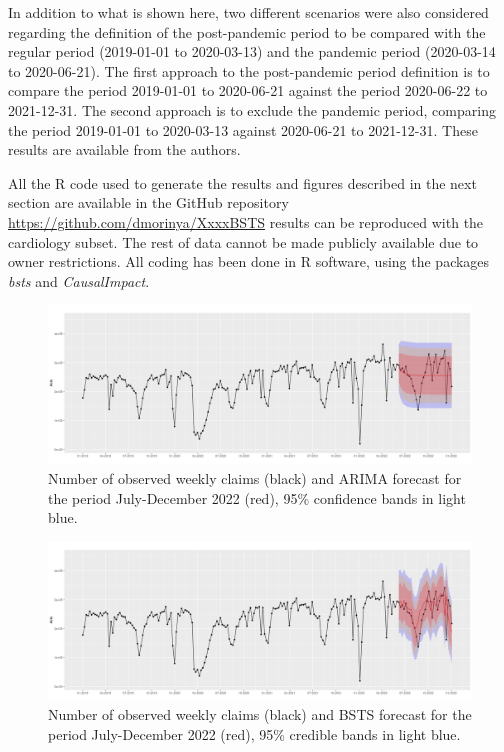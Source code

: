 \documentclass[]{risa}
\begin{document}
In addition to what is shown here, two different scenarios were also considered regarding the definition of the post-pandemic period to be compared with the regular period (2019-01-01 to 2020-03-13) and the pandemic period (2020-03-14 to 2020-06-21). The first approach to the post-pandemic period definition is to compare the period 2019-01-01 to 2020-06-21 against the period 2020-06-22 to 2021-12-31. The second approach is to exclude the pandemic period, comparing the period 2019-01-01 to 2020-03-13 against 2020-06-21 to 2021-12-31. These results are available from the authors.

All the R code used to generate the results and figures described in the next section are available in the GitHub repository \url{https://github.com/dmorinya/XxxxBSTS} results can be reproduced with the cardiology subset. The rest of data cannot be made publicly available due to owner restrictions. All coding has been done in R software\cite{r_core_team_r_2019}, using the packages \textit{bsts}\cite{scott_predicting_nodate} and \textit{CausalImpact}\cite{brodersen_inferring_2015}. 
	
\begin{center}
  \begin{figure}[h]
	\begin{minipage}{160mm}
    \includegraphics[width=16cm]{arima_global_prediction.png}\caption{Number of observed weekly claims (black) and ARIMA forecast for the period July-December 2022 (red), 95\% confidence bands in light blue.}\label{fig1}
	 \end{minipage}
  \end{figure}
	\end{center}

\begin{center}
  \begin{figure}[h]
	\begin{minipage}{160mm}
    \includegraphics[width=16cm]{bsts_global_prediction.png}\caption{Number of observed weekly claims (black) and BSTS forecast for the period July-December 2022 (red), 95\% credible bands in light blue.}\label{fig2}
  \end{minipage}
  \end{figure}
\end{center}
\end{document}
